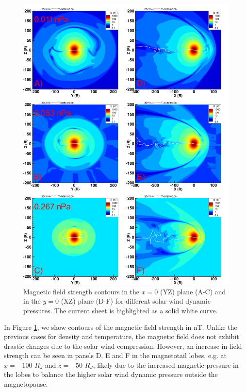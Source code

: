 \begin{figure}
    \centering
    \includegraphics[height=0.9\textheight]{images6/compare_runs_currentsheet_Bmag.png}
    \caption{Magnetic field strength contours in the $x=0$ (YZ) plane (A-C) and in the $y=0$ (XZ) plane (D-F) for different solar wind dynamic pressures. The current sheet is highlighted as a solid white curve.}
    \label{fig:chp6-comparison-slices-Bmag}
\end{figure}

In Figure \ref{fig:chp6-comparison-slices-Bmag}, we show contours of the magnetic field strength in nT. Unlike the previous cases for density and temperature, the magnetic field does not exhibit drastic changes due to the solar wind compression. However, an increase in field strength can be seen in panels D, E and F in the magnetotail lobes, e.g. at $x=-100$ $R_J$ and $z=-50$ $R_J$, likely due to the increased magnetic pressure in the lobes to balance the higher solar wind dynamic pressure outside the magnetopause. 

